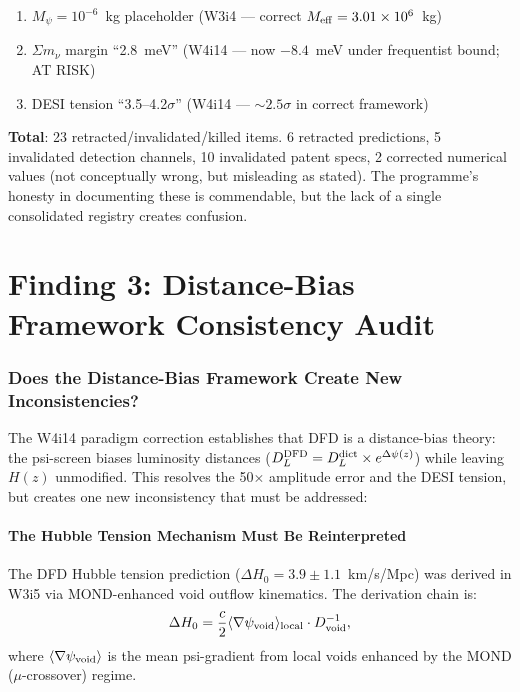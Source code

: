 \documentclass[11pt]{article}
\newcommand{\ee}[1]{\times 10^{#1}}
\newcommand{\Dpsi}{\Delta\psi}
\begin{document}
\begin{enumerate}
\item $M_\psi = 10^{-6}$~kg placeholder (W3i4 --- correct $M_{\rm eff}
  = 3.01\ee{6}$~kg)
\item $\Sigma m_\nu$ margin ``2.8~meV'' (W4i14 --- now $-8.4$~meV under
  frequentist bound; AT RISK)
\item DESI tension ``3.5--4.2$\sigma$'' (W4i14 --- $\sim 2.5\sigma$ in
  correct framework)
\end{enumerate}

\begin{tcolorbox}[colback=yellow!10, colframe=yellow!70!black]
\textbf{Total}: 23 retracted/invalidated/killed items.  6 retracted
predictions, 5 invalidated detection channels, 10 invalidated patent
specs, 2 corrected numerical values (not conceptually wrong, but
misleading as stated).  The programme's honesty in documenting these
is commendable, but the lack of a single consolidated registry creates
confusion.
\end{tcolorbox}


\part{Finding 3: Distance-Bias Framework Consistency Audit}
\label{sec:distance-bias}

\section{Does the Distance-Bias Framework Create New Inconsistencies?}

The W4i14 paradigm correction establishes that DFD is a distance-bias
theory: the psi-screen biases luminosity distances ($D_L^{\rm DFD} =
D_L^{\rm dict} \times e^{\Dpsi(z)}$) while leaving $H(z)$ unmodified.
This resolves the 50$\times$ amplitude error and the DESI tension, but
creates one new inconsistency that must be addressed:

\subsection{The Hubble Tension Mechanism Must Be Reinterpreted}

The DFD Hubble tension prediction ($\Delta H_0 = 3.9 \pm 1.1$~km/s/Mpc)
was derived in W3i5 via MOND-enhanced void outflow kinematics.  The
derivation chain is:
\begin{equation}
\Delta H_0 = \frac{c}{2}\langle\nabla\psi_{\rm void}\rangle_{\rm local}
\cdot D_{\rm void}^{-1},
\end{equation}
where $\langle\nabla\psi_{\rm void}\rangle$ is the mean psi-gradient
from local voids enhanced by the MOND ($\mu$-crossover) regime.
\end{document}
